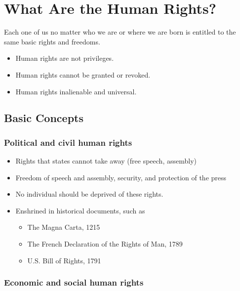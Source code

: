 \documentclass[
]{book}
\begin{document}
\hypertarget{what-are-the-human-rights}{%
\section{What Are the Human Rights?}\label{what-are-the-human-rights}}

Each one of us no matter who we are or where we are born is entitled to the same basic rights and freedoms.

\begin{itemize}
\item
  Human rights are not privileges.
\item
  Human rights cannot be granted or revoked.
\item
  Human rights inalienable and universal.
\end{itemize}

\hypertarget{basic-concepts}{%
\subsection{Basic Concepts}\label{basic-concepts}}

\hypertarget{political-and-civil-human-rights}{%
\subsubsection{Political and civil human rights}\label{political-and-civil-human-rights}}

\begin{itemize}
\item
  Rights that states cannot take away (free speech, assembly)
\item
  Freedom of speech and assembly, security, and protection of the press
\item
  No individual should be deprived of these rights.
\item
  Enshrined in historical documents, such as

  \begin{itemize}
  \item
    The Magna Carta, 1215
  \item
    The French Declaration of the Rights of Man, 1789
  \item
    U.S. Bill of Rights, 1791
  \end{itemize}
\end{itemize}

\hypertarget{economic-and-social-human-rights}{%
\subsubsection{Economic and social human rights}\label{economic-and-social-human-rights}}
\end{document}
